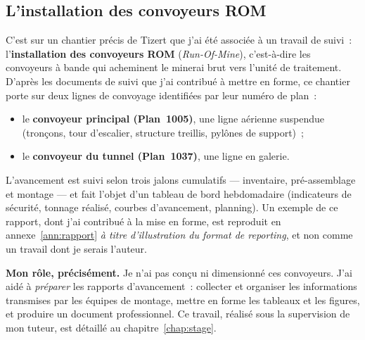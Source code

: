 \subsection{L'installation des convoyeurs ROM}

C'est sur un chantier précis de Tizert que j'ai été associée à un travail de suivi~: l'\textbf{installation des convoyeurs ROM} (\textit{Run-Of-Mine}), c'est-à-dire les convoyeurs à bande qui acheminent le minerai brut vers l'unité de traitement. D'après les documents de suivi que j'ai contribué à mettre en forme, ce chantier porte sur deux lignes de convoyage identifiées par leur numéro de plan~:

\begin{itemize}
\item le \textbf{convoyeur principal (Plan~1005)}, une ligne aérienne suspendue (tronçons, tour d'escalier, structure treillis, pylônes de support)~;
\item le \textbf{convoyeur du tunnel (Plan~1037)}, une ligne en galerie.
\end{itemize}

L'avancement est suivi selon trois jalons cumulatifs --- inventaire, pré-assemblage et montage --- et fait l'objet d'un tableau de bord hebdomadaire (indicateurs de sécurité, tonnage réalisé, courbes d'avancement, planning). Un exemple de ce rapport, dont j'ai contribué à la mise en forme, est reproduit en annexe~\ref{ann:rapport} \emph{à titre d'illustration du format de reporting}, et non comme un travail dont je serais l'auteur.

\begin{presente}
\textbf{Mon rôle, précisément.} Je n'ai pas conçu ni dimensionné ces convoyeurs. J'ai aidé à \emph{préparer} les rapports d'avancement~: collecter et organiser les informations transmises par les équipes de montage, mettre en forme les tableaux et les figures, et produire un document professionnel. Ce travail, réalisé sous la supervision de mon tuteur, est détaillé au chapitre~\ref{chap:stage}.
\end{presente}
